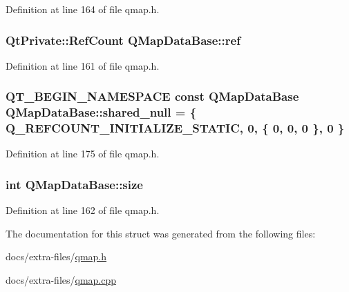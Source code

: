 Definition at line 164 of file qmap.\+h.

\subsubsection[{\texorpdfstring{ref}{ref}}]{\setlength{\rightskip}{0pt plus 5cm}Qt\+Private\+::\+Ref\+Count Q\+Map\+Data\+Base\+::ref}\hypertarget{struct_q_map_data_base_ab3039892c5c68597eeb0746c26459d42}{}\label{struct_q_map_data_base_ab3039892c5c68597eeb0746c26459d42}


Definition at line 161 of file qmap.\+h.

\subsubsection[{\texorpdfstring{shared\+\_\+null}{shared_null}}]{\setlength{\rightskip}{0pt plus 5cm}Q\+T\+\_\+\+B\+E\+G\+I\+N\+\_\+\+N\+A\+M\+E\+S\+P\+A\+CE const {\bf Q\+Map\+Data\+Base} Q\+Map\+Data\+Base\+::shared\+\_\+null = \{ Q\+\_\+\+R\+E\+F\+C\+O\+U\+N\+T\+\_\+\+I\+N\+I\+T\+I\+A\+L\+I\+Z\+E\+\_\+\+S\+T\+A\+T\+IC, 0, \{ 0, 0, 0 \}, 0 \}\hspace{0.3cm}{\ttfamily [static]}}\hypertarget{struct_q_map_data_base_ac279e752e04494bb619c9d26763d2eb7}{}\label{struct_q_map_data_base_ac279e752e04494bb619c9d26763d2eb7}


Definition at line 175 of file qmap.\+h.

\subsubsection[{\texorpdfstring{size}{size}}]{\setlength{\rightskip}{0pt plus 5cm}int Q\+Map\+Data\+Base\+::size}\hypertarget{struct_q_map_data_base_a61b8b87aa9f55d8380f67b5b9f4bc786}{}\label{struct_q_map_data_base_a61b8b87aa9f55d8380f67b5b9f4bc786}


Definition at line 162 of file qmap.\+h.



The documentation for this struct was generated from the following files\+:\begin{DoxyCompactItemize}
\item 
docs/extra-\/files/\hyperlink{qmap_8h}{qmap.\+h}\item 
docs/extra-\/files/\hyperlink{qmap_8cpp}{qmap.\+cpp}\end{DoxyCompactItemize}
